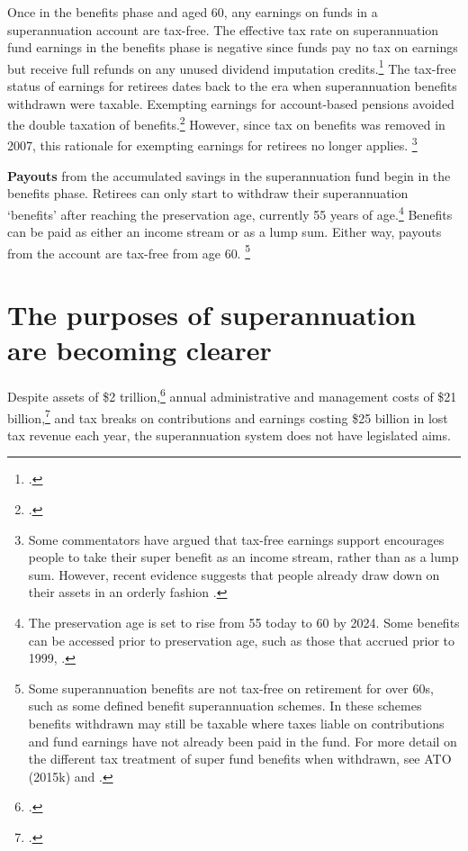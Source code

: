 \documentclass{grattanAlpha}
\begin{document}
Once in the benefits phase and aged 60, any earnings on funds in a superannuation account are tax-free. The effective tax rate on superannuation fund earnings in the benefits phase is negative since funds pay no tax on earnings but receive full refunds on any unused dividend imputation credits.\footcites{ATO2015RefundingImputationCredits}[][Appendix~B]{FinancialSystemsInquiry2015} The tax-free status of earnings for retirees dates back to the era when superannuation benefits withdrawn were taxable. Exempting earnings for account-based pensions avoided the double taxation of benefits.\footcite{HenryTaxReview2010} However, since tax on benefits was removed in 2007, this rationale for exempting earnings for retirees no longer applies.%
\footnote{Some commentators have argued that tax-free earnings support encourages people to take their super benefit as an income stream, rather than as a lump sum. However, recent evidence suggests that people already draw down on their assets in an orderly fashion \textcite[][16]{ProductivityCommission2015SuperPolicyPostRetirement}.} 

 \textbf{Payouts} from the accumulated savings in the superannuation fund begin in the benefits phase.  Retirees can only start to withdraw their superannuation ‘benefits’ after reaching the preservation age, currently 55 years of age.\footnote{The preservation age is set to rise from 55 today to 60 by 2024. Some benefits can be accessed prior to preservation age, such as those that accrued prior to 1999, \textcite{ATO2015WhenYouCanAccessYourSuper}.} Benefits can be paid as either an income stream or as a lump sum. Either way, payouts from the account are tax-free from age 60.%
 \footnote{Some superannuation benefits are not tax-free on retirement for over 60s, such as some defined benefit superannuation schemes. In these schemes benefits withdrawn may still be taxable where taxes liable on contributions and fund earnings have not already been paid in the fund. For more detail on the different tax treatment of super fund benefits when withdrawn, see \textcite{ATO2015HowTaxAppliesToSuper} ATO (2015k) and \textcite[][13]{Mercer2015SubmissionToReThink}.}

 \section{The purposes of superannuation are becoming clearer}
 Despite assets of \$2 trillion,\footcite{APRA2015JuneSuperPerformance} annual administrative and management costs of \$21 billion,\footcite{MinifieSavageCameron2015} and tax breaks on contributions and earnings costing \$25 billion in lost tax revenue each year, the superannuation system does not have legislated aims. 
\end{document}

